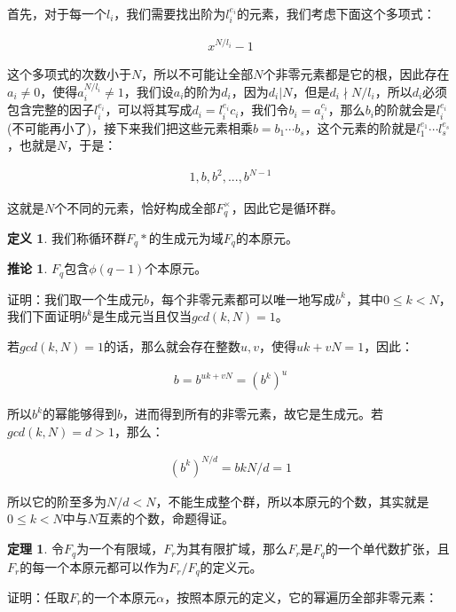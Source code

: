 \documentclass[12pt, a4paper, oneside]{ctexart}
\theoremstyle{definition}
\newtheorem*{definition}{定义}
\newtheorem*{theorem}{定理}
\newtheorem*{corollary}{推论}
\begin{document}
首先，对于每一个$l_i$，我们需要找出阶为$l_i^{e_i}$的元素，我们考虑下面这个多项式：

\begin{align*}
x^{N/l_i}-1
\end{align*}

这个多项式的次数小于$N$，所以不可能让全部$N$个非零元素都是它的根，因此存在$a_i\neq 0$，使得$a_i^{N/l_i}\neq 1$，我们设$a_i$的阶为$d_i$，因为$d_i|N$，但是$d_i\nmid N/l_i$，所以$d_i$必须包含完整的因子$l_i^{e_i}$，可以将其写成$d_i=l_i^{e_i}c_i$，我们令$b_i=a_i^{c_i}$，那么$b_i$的阶就会是$l_i^{e_i}$(不可能再小了)，接下来我们把这些元素相乘$b=b_1\cdots b_s$，这个元素的阶就是$l_1^{e_1}\cdots l_s^{e_s}$，也就是$N$，于是：

\begin{align*}
1,b,b^2,...,b^{N-1}
\end{align*}

这就是$N$个不同的元素，恰好构成全部$F_q^{\times}$，因此它是循环群。

\begin{definition}
我们称循环群$F_q*$的生成元为域$F_q$的本原元。
\end{definition}

\begin{corollary}
$F_q$包含$\phi(q-1)$个本原元。
\end{corollary}

证明：我们取一个生成元$b$，每个非零元素都可以唯一地写成$b^k$，其中$0\leqslant k<N$，我们下面证明$b^k$是生成元当且仅当$gcd(k,N)=1$。

若$gcd(k,N)=1$的话，那么就会存在整数$u,v$，使得$uk+vN=1$，因此：

\begin{align*}
b=b^{uk+vN}=(b^k)^u
\end{align*}

所以$b^k$的幂能够得到$b$，进而得到所有的非零元素，故它是生成元。若$gcd(k,N)=d>1$，那么：

\begin{align*}
(b^k)^{N/d}=b{kN/d}=1
\end{align*}

所以它的阶至多为$N/d<N$，不能生成整个群，所以本原元的个数，其实就是$0\leqslant k<N$中与$N$互素的个数，命题得证。

\begin{theorem}
令$F_q$为一个有限域，$F_r$为其有限扩域，那么$F_r$是$F_q$的一个单代数扩张，且$F_r$的每一个本原元都可以作为$F_r/F_q$的定义元。
\end{theorem}

证明：任取$F_r$的一个本原元$\alpha$，按照本原元的定义，它的幂遍历全部非零元素：
\end{document}
